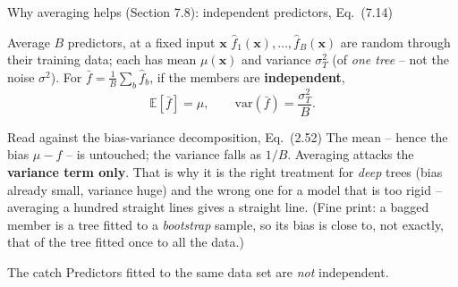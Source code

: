 \documentclass[10pt,aspectratio=169]{beamer}
\newcommand{\var}{\mathrm{var}}
\begin{document}
\begin{frame}{Why averaging helps (Section 7.8): independent predictors, Eq.\ (7.14)}
\small
\begin{block}{Average $B$ predictors, at a fixed input $\bm{x}$}
$\hat f_1(\bm{x}),\dots,\hat f_B(\bm{x})$ are random through their training
data; each has mean $\mu(\bm{x})$ and variance $\sigma_T^2$ (of \emph{one
tree} -- not the noise $\sigma^2$).  For $\bar f=\frac1B\sum_b\hat f_b$, if
the members are \textbf{independent},
\[
  \mathbb{E}[\bar f]=\mu,\qquad
  \var(\bar f)=\frac{\sigma_T^2}{B}.
\]
\end{block}
\begin{block}{Read against the bias-variance decomposition, Eq.\ (2.52)}
The mean -- hence the bias $\mu-f$ -- is untouched; the variance falls as
$1/B$.  Averaging attacks the \textbf{variance term only}.  That is why it
is the right treatment for \emph{deep} trees (bias already small, variance
huge) and the wrong one for a model that is too rigid -- averaging a
hundred straight lines gives a straight line.  (Fine print: a bagged
member is a tree fitted to a \emph{bootstrap} sample, so its bias is close
to, not exactly, that of the tree fitted once to all the data.)
\end{block}
\begin{block}{The catch}
Predictors fitted to the same data set are \emph{not} independent.
\end{block}
\end{frame}
\end{document}
